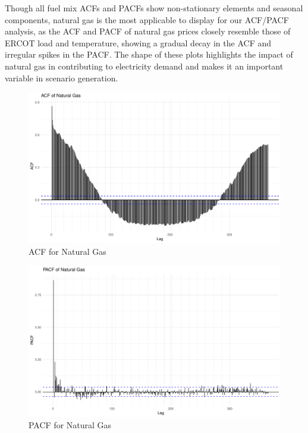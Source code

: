 \documentclass[
]{article}
\begin{document}
Though all fuel mix ACFs and PACFs show non-stationary elements and
seasonal components, natural gas is the most applicable to display for
our ACF/PACF analysis, as the ACF and PACF of natural gas prices closely
resemble those of ERCOT load and temperature, showing a gradual decay in
the ACF and irregular spikes in the PACF. The shape of these plots
highlights the impact of natural gas in contributing to electricity
demand and makes it an important variable in scenario generation.

\begin{figure}
\centering
\includegraphics{FinalProject_Report_files/figure-latex/ACF for Natural Gas-1.pdf}
\caption{ACF for Natural Gas}
\end{figure}

\begin{figure}
\centering
\includegraphics{FinalProject_Report_files/figure-latex/PACF for Natural Gas-1.pdf}
\caption{PACF for Natural Gas}
\end{figure}

\newpage
\end{document}
